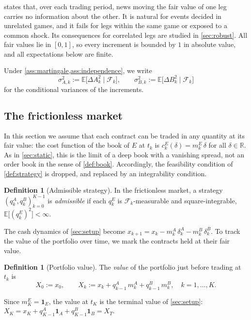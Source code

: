 \documentclass[11pt,a4paper]{article}
\theoremstyle{plain}
\theoremstyle{definition}
\newtheorem{definition}[theorem]{Definition}
\theoremstyle{remark}
\newcommand{\E}{\mathbb{E}}
\newcommand{\1}{\mathbf{1}}
\newcommand{\F}{\mathcal{F}}
\newcommand{\R}{\mathbb{R}}
\begin{document}
 states that, over each trading period, news moving the fair value of one leg carries no information about the other. It is natural for events decided in unrelated games, and it fails for legs within the same game or exposed to a common shock. Its consequences for correlated legs are studied in \cref{sec:robust}. All fair values lie in $[0,1]$, so every increment is bounded by $1$ in absolute value, and all expectations below are finite.

Under \cref{ass:martingale,ass:independence}, we write
\[
\sigma^2_{A,k} := \E\bigl[\Delta A_k^2\mid\F_k\bigr],\qquad \sigma^2_{B,k} := \E\bigl[\Delta B_k^2\mid\F_k\bigr]
\]
for the conditional variances of the increments.

\subsection{The frictionless market}

In this section we assume that each contract can be traded in any quantity at its fair value: the cost function of the book of $E$ at $t_k$ is $c^E_k(\delta) = m^E_k\,\delta$ for all $\delta\in\R$. As in \cref{sec:static}, this is the limit of a deep book with a vanishing spread, not an order book in the sense of \cref{def:book}. Accordingly, the feasibility condition of \cref{def:strategy} is dropped, and replaced by an integrability condition.

\begin{definition}[Admissible strategy]
\label{def:admissible}
In the frictionless market, a strategy $(q^A_k,q^B_k)_{k=0}^{K-1}$ is \emph{admissible} if each $q^E_k$ is $\F_k$-measurable and square-integrable, $\E\bigl[(q^E_k)^2\bigr]<\infty$.
\end{definition}

The cash dynamics of \cref{sec:setup} become $x_{k+1} = x_k - m^A_k\,\delta^A_k - m^B_k\,\delta^B_k$. To track the value of the portfolio over time, we mark the contracts held at their fair value.

\begin{definition}[Portfolio value]
\label{def:portfolio-value}
The \emph{value} of the portfolio just before trading at $t_k$ is
\[
X_0 := x_0,\qquad X_k := x_k + q^A_{k-1}\,m^A_k + q^B_{k-1}\,m^B_k,\quad k=1,\dots,K.
\]
\end{definition}

Since $m^E_K = \1_E$, the value at $t_K$ is the terminal value of \cref{sec:setup}: $X_K = x_K + q^A_{K-1}\1_A + q^B_{K-1}\1_B = X_T$.
\end{document}
